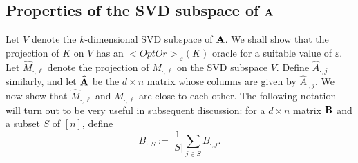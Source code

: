 \documentclass[11pt,letterpaper]{article}
\newcounter{note}[section]
\def\mathsf#1{<#1>}%
\theoremstyle{definition}
\theoremstyle{remark}
\newcommand{\bP}{{\bf P}}
\newcommand{\bA}{{\bf A}}
\newcommand{\hatM}{{\widehat M}}
\newcommand{\hatA}{{\widehat A}}
\newcommand{\Mdot}[1]{{M_{\cdot, #1}}}
\newcommand{\hMdot}[1]{{\hatM_{\cdot, #1}}}
\newcommand{\Pdot}[1]{{P_{\cdot, #1}}}
\newcommand{\Adot}[1]{{A_{\cdot, #1}}}
\newcommand{\hAdot}[1]{{\hatA_{\cdot, #1}}}
\newcommand{\opto}{{\mathsf{OptOr}}}
\begin{document}

\subsection{Properties of the SVD subspace of $\bA$}
Let $V$ denote  the $k$-dimensional SVD subspace of $\bA$. We shall show that the projection of $K$ on $V$ has an   $\opto_\varepsilon(K)$ oracle for a suitable value of $\varepsilon$. Let $\hMdot{\ell}$ denote the projection of $\Mdot{\ell}$ on the SVD subspace $V$. Define $\hAdot{j}$ similarly, and let $\widehat{\bA}$ be the $d \times n$ matrix whose columns are given by $\hAdot{j}$. We now show that $\hMdot{\ell}$ and  $\Mdot{\ell}$ are close to each other. The following notation will turn out to be very useful in subsequent discussion: for a $d \times n$ matrix ${\bf B}$ and a subset $S$ of $[n]$, define 
$$ B_{\cdot, S} := \frac{1}{|S|} \sum_{j \in S} B_{\cdot, j}.$$
\end{document}
